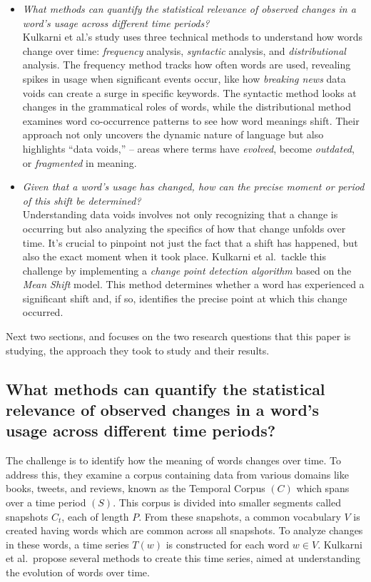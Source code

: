 \begin{itemize}
    \item {} \emph{What methods can quantify the statistical relevance of observed changes in a word's usage across different time periods?}\\
    Kulkarni et al.’s study uses three technical methods to understand how words change over time: \emph{frequency} analysis, \emph{syntactic} analysis, and \emph{distributional} analysis.
    The frequency method tracks how often words are used, revealing spikes in usage when significant events occur, like how \emph{breaking news} data voids can create a surge in specific keywords.
    The syntactic method looks at changes in the grammatical roles of words, while the distributional method examines word co-occurrence patterns to see how word meanings shift.
    Their approach not only uncovers the dynamic nature of language but also highlights “data voids,” -- areas where terms have \emph{evolved}, become \emph{outdated}, or \emph{fragmented} in meaning.

    \item {} \emph{Given that a word's usage has changed, how can the precise moment or period of this shift be determined?}\\
    Understanding data voids involves not only recognizing that a change is occurring but also analyzing the specifics of how that change unfolds over time.
    It’s crucial to pinpoint not just the fact that a shift has happened, but also the exact moment when it took place.
    Kulkarni et al.\ tackle this challenge by implementing a \emph{change point detection algorithm} based on the \emph{Mean Shift} model.
    This method determines whether a word has experienced a significant shift and, if so, identifies the precise point at which this change occurred.
\end{itemize}

Next two sections,  and  focuses on the two research questions that this paper is studying, the approach they took to study and their results.

\subsection{What methods can quantify the statistical relevance of observed changes in a word's usage across different time periods?} \label{subsec:kulkarni-rq1}

The challenge is to identify how the meaning of words changes over time.
To address this, they examine a corpus containing data from various domains like books, tweets, and reviews, known as the Temporal Corpus $(C)$ which spans over a time period $(S)$.
This corpus is divided into smaller segments called snapshots $C_t$, each of length $P$.
From these snapshots, a common vocabulary $V$ is created having words which are common across all snapshots.
To analyze changes in these words, a time series $T(w)$ is constructed for each word $w\in V$.
Kulkarni et al.\ propose several methods to create this time series, aimed at understanding the evolution of words over time.

